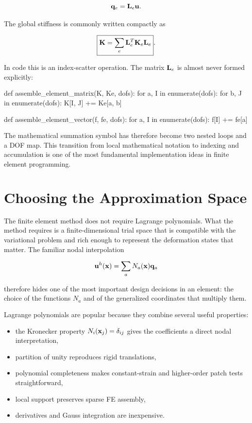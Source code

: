 \begin{equation}
    \mathbf{q}_e=\mathbf{L}_e\mathbf{u}.
\end{equation}

The global stiffness is commonly written compactly as

\begin{equation}
    \boxed{
    \mathbf{K}=\sum_e\mathbf{L}_e^T\mathbf{K}_e\mathbf{L}_e
    }.
\end{equation}

In code this is an index-scatter operation. The matrix $\mathbf{L}_e$ is almost never
formed explicitly:

\begin{python}
def assemble_element_matrix(K, Ke, dofs):
    for a, I in enumerate(dofs):
        for b, J in enumerate(dofs):
            K[I, J] += Ke[a, b]


def assemble_element_vector(f, fe, dofs):
    for a, I in enumerate(dofs):
        f[I] += fe[a]
\end{python}

The mathematical summation symbol has therefore become two nested loops and a
DOF map. This transition from local mathematical notation to indexing and
accumulation is one of the most fundamental implementation ideas in finite
element programming.


\section{Choosing the Approximation Space}\label{sec:fe-approximation-space}

The finite element method does not require Lagrange polynomials.  What the
method requires is a finite-dimensional trial space that is compatible with the
variational problem and rich enough to represent the deformation states that
matter.  The familiar nodal interpolation

\begin{equation}
    \mathbf{u}^{h}(\mathbf{x})=\sum_a N_a(\mathbf{x})\mathbf{q}_a
\end{equation}

therefore hides one of the most important design decisions in an element: the
choice of the functions $N_a$ and of the generalized coordinates that multiply
them.

Lagrange polynomials are popular because they combine several useful properties:

\begin{itemize}
    \item the Kronecker property $N_i(\mathbf{x}_j)=\delta_{ij}$ gives the
          coefficients a direct nodal interpretation,
    \item partition of unity reproduces rigid translations,
    \item polynomial completeness makes constant-strain and higher-order patch
          tests straightforward,
    \item local support preserves sparse FE assembly,
    \item derivatives and Gauss integration are inexpensive.
\end{itemize}

